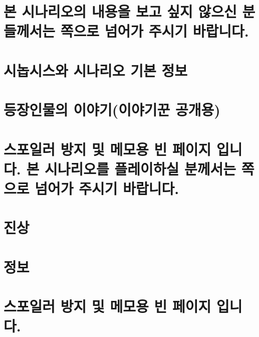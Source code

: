 \documentclass{report}
\begin{document}
	\chapter*{본 시나리오의 내용을 보고 싶지 않으신 분들께서는 \pageref{endof_Tower}쪽으로 넘어가 주시기 바랍니다.}
	
	\chapter{시놉시스와 시나리오 기본 정보}
	
	\chapter{등장인물의 이야기(이야기꾼 공개용)}
	
	\chapter*{스포일러 방지 및 메모용 빈 페이지 입니다. 본 시나리오를 플레이하실 분께서는 \pageref{endof_Unliving}쪽으로 넘어가 주시기 바랍니다.}
	
	\parttoc
	
	\chapter{진상}		
		
	
	\chapter{정보}
		
	\chapter*{스포일러 방지 및 메모용 빈 페이지 입니다.}
\end{document}
